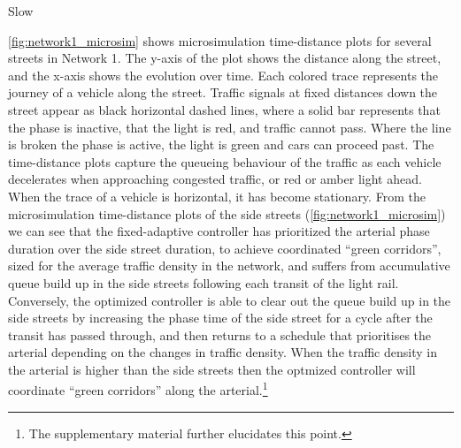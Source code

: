 \begin{figure*}[t!] \centering
%
Slow
%
\vspace{-2mm}
\caption{Impact of fast light rail on number of stops for Network 1.}
\label{fig:network1_hist_fast}
\end{figure*}

\cref{fig:network1_microsim} shows microsimulation time-distance plots for several streets in Network 1. The y-axis of the plot
shows the distance along the street, and the x-axis shows the evolution over time. Each colored trace represents the journey of a vehicle along the street. Traffic signals at fixed distances down the street appear as black horizontal dashed lines, where a solid bar represents that the phase is inactive, that the light is red, and traffic cannot pass. Where the line is broken the phase is active, the light is green and cars can proceed past. The time-distance plots capture the queueing behaviour of the traffic as each vehicle decelerates when approaching congested traffic, or red or amber light ahead. When the trace of a vehicle is horizontal, it has become stationary.
From the microsimulation time-distance plots of the side streets (\cref{fig:network1_microsim}) we can see that the fixed-adaptive controller has prioritized the arterial phase duration over the side street duration, to achieve coordinated ``green corridors'', sized for the average traffic density in the network, and suffers from accumulative queue build up in the side streets following each transit of the light rail.
Conversely, the optimized controller is able to clear out the queue build up in the side streets by increasing the phase time of the side street for a cycle after the transit has passed through, and then returns to a schedule that prioritises the arterial depending on the changes in traffic density. When the traffic density in the arterial is higher than the side streets then the optmized controller will coordinate ``green corridors'' along the arterial.\footnote{The supplementary material further elucidates this point.}

